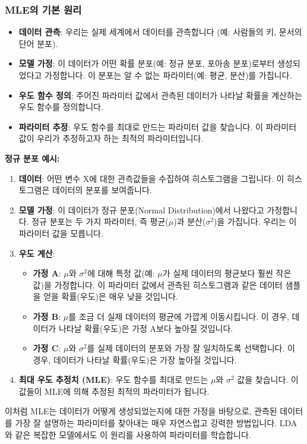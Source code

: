 \documentclass[11pt,a4paper]{article}
\begin{document}
\subsubsection*{MLE의 기본 원리}
\begin{itemize}
    \item \textbf{데이터 관측}: 우리는 실제 세계에서 데이터를 관측합니다 (예: 사람들의 키, 문서의 단어 분포).
    \item \textbf{모델 가정}: 이 데이터가 어떤 확률 분포(예: 정규 분포, 포아송 분포)로부터 생성되었다고 가정합니다. 이 분포는 알 수 없는 파라미터(예: 평균, 분산)를 가집니다.
    \item \textbf{우도 함수 정의}: 주어진 파라미터 값에서 관측된 데이터가 나타날 확률을 계산하는 우도 함수를 정의합니다.
    \item \textbf{파라미터 추정}: 우도 함수를 최대로 만드는 파라미터 값을 찾습니다. 이 파라미터 값이 우리가 추정하고자 하는 최적의 파라미터입니다.
\end{itemize}

\begin{examplebox}
\textbf{정규 분포 예시:}
\begin{enumerate}
    \item \textbf{데이터}: 어떤 변수 X에 대한 관측값들을 수집하여 히스토그램을 그립니다. 이 히스토그램은 데이터의 분포를 보여줍니다.
    \item \textbf{모델 가정}: 이 데이터가 정규 분포(Normal Distribution)에서 나왔다고 가정합니다. 정규 분포는 두 가지 파라미터, 즉 평균($\mu$)과 분산($\sigma^2$)을 가집니다. 우리는 이 파라미터 값을 모릅니다.
    \item \textbf{우도 계산}:
    \begin{itemize}
        \item \textbf{가정 A}: $\mu$와 $\sigma^2$에 대해 특정 값(예: $\mu$가 실제 데이터의 평균보다 훨씬 작은 값)을 가정합니다. 이 파라미터 값에서 관측된 히스토그램과 같은 데이터 샘플을 얻을 확률(우도)은 매우 낮을 것입니다.
        \item \textbf{가정 B}: $\mu$를 조금 더 실제 데이터의 평균에 가깝게 이동시킵니다. 이 경우, 데이터가 나타날 확률(우도)은 가정 A보다 높아질 것입니다.
        \item \textbf{가정 C}: $\mu$와 $\sigma^2$를 실제 데이터의 분포와 가장 잘 일치하도록 선택합니다. 이 경우, 데이터가 나타날 확률(우도)은 가장 높아질 것입니다.
    \end{itemize}
    \item \textbf{최대 우도 추정치 (MLE)}: 우도 함수를 최대로 만드는 $\mu$와 $\sigma^2$ 값을 찾습니다. 이 값들이 MLE에 의해 추정된 최적의 파라미터가 됩니다.
\end{enumerate}
이처럼 MLE는 데이터가 어떻게 생성되었는지에 대한 가정을 바탕으로, 관측된 데이터를 가장 잘 설명하는 파라미터를 찾아내는 매우 자연스럽고 강력한 방법입니다. LDA와 같은 복잡한 모델에서도 이 원리를 사용하여 파라미터를 학습합니다.
\end{examplebox}
\end{document}
